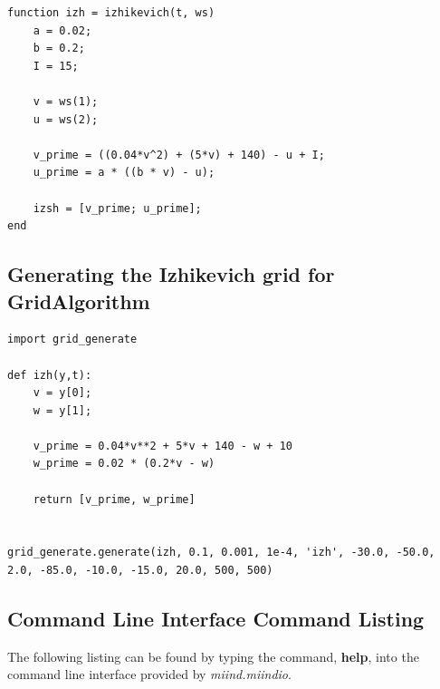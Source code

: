 \documentclass[utf8]{frontiers_suppmat} %
\begin{document}
\begin{lstlisting}[caption={File izhikevich.m.}]
function izh = izhikevich(t, ws)
    a = 0.02;
    b = 0.2;
    I = 15;
    
    v = ws(1);
    u = ws(2);
    
    v_prime = ((0.04*v^2) + (5*v) + 140) - u + I;
    u_prime = a * ((b * v) - u);
    
    izsh = [v_prime; u_prime];
end
\end{lstlisting}

\subsection{Generating the Izhikevich grid for GridAlgorithm}

\begin{lstlisting}
import grid_generate

def izh(y,t):
    v = y[0];
    w = y[1];

    v_prime = 0.04*v**2 + 5*v + 140 - w + 10
    w_prime = 0.02 * (0.2*v - w)

    return [v_prime, w_prime]


grid_generate.generate(izh, 0.1, 0.001, 1e-4, 'izh', -30.0, -50.0, 2.0, -85.0, -10.0, -15.0, 20.0, 500, 500)
\end{lstlisting}

\subsection{Command Line Interface Command Listing}
\label{clilisting}

The following listing can be found by typing the command, \textbf{help}, into the command line interface provided by \textit{miind.miindio}.
\end{document}
